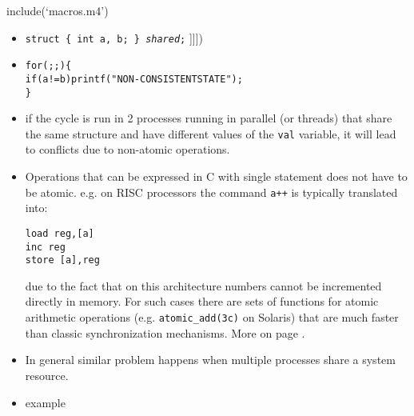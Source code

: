 include(`macros.m4')

\pagebreak
{}

\begin{slide}
\end{slide}



\begin{slide}
\begin{itemize}
ifdef([[[NOSPELLCHECK]]], [[[
\item \texttt{struct \{ int a, b; \} \emph{shared};}
]]])
\item
\begin{alltt}
for( ; ; ) \{
    if (a != b) printf("NON-CONSISTENT STATE");
\}
\end{alltt}
\item if the cycle is run in 2 processes running in parallel (or threads)
that share the same structure and have different values of the
\texttt{val} variable, it will lead to conflicts due to non-atomic operations.
\end{itemize}
\end{slide}


\begin{itemize}
\item Operations that can be expressed in C with single statement does not
have to be atomic. e.g. on RISC processors the command \verb.a++.
is typically translated into:

\begin{verbatim}
load reg,[a]
inc reg
store [a],reg
\end{verbatim}

due to the fact that on this architecture numbers cannot be incremented
directly in memory. For such cases there are sets of functions for atomic
arithmetic operations (e.g. \texttt{atomic\_add(3c)} on Solaris) that are
much faster than classic synchronization mechanisms.
More on page \pageref{ATOMIC_ADD}.
\item In general similar problem happens when multiple processes share a 
system resource.
\item {} example 
\end{itemize}

